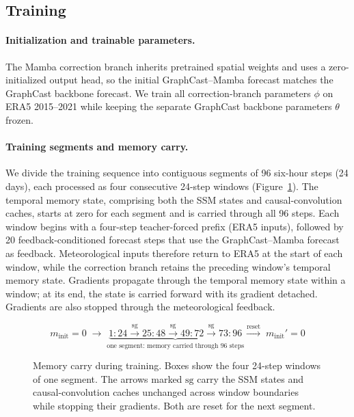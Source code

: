 \documentclass[11pt]{article}
\begin{document}
\subsection{Training}
\label{sec:training}
\paragraph{Initialization and trainable parameters.}
The Mamba correction branch inherits pretrained spatial weights and uses a zero-initialized output head, so the initial GraphCast--Mamba forecast matches the GraphCast backbone forecast. We train all correction-branch parameters $\phi$ on ERA5 2015--2021 while keeping the separate GraphCast backbone parameters $\theta$ frozen.

\paragraph{Training segments and memory carry.}
We divide the training sequence into contiguous segments of 96 six-hour steps (24 days), each processed as four consecutive 24-step windows (Figure~\ref{fig:training_segments}). The temporal memory state, comprising both the SSM states and causal-convolution caches, starts at zero for each segment and is carried through all 96 steps. Each window begins with a four-step teacher-forced prefix (ERA5 inputs), followed by 20 feedback-conditioned forecast steps that use the GraphCast--Mamba forecast as feedback. Meteorological inputs therefore return to ERA5 at the start of each window, while the correction branch retains the preceding window's temporal memory state. Gradients propagate through the temporal memory state within a window; at its end, the state is carried forward with its gradient detached. Gradients are also stopped through the meteorological feedback.

\begin{figure}[!htbp]
    \centering
    \normalsize
    \[
    m_{\mathrm{init}}=0\;\longrightarrow\;
    \underbrace{
      \boxed{1{:}24}
      \xrightarrow{\mathrm{sg}}\boxed{25{:}48}
      \xrightarrow{\mathrm{sg}}\boxed{49{:}72}
      \xrightarrow{\mathrm{sg}}\boxed{73{:}96}
    }_{\text{one segment: memory carried through 96 steps}}
    \xrightarrow{\mathrm{reset}}\;m_{\mathrm{init}}'=0
    \]
    \caption{Memory carry during training. Boxes show the four 24-step windows of one segment. The arrows marked $\mathrm{sg}$ carry the SSM states and causal-convolution caches unchanged across window boundaries while stopping their gradients. Both are reset for the next segment.}
    \label{fig:training_segments}
\end{figure}
\end{document}
